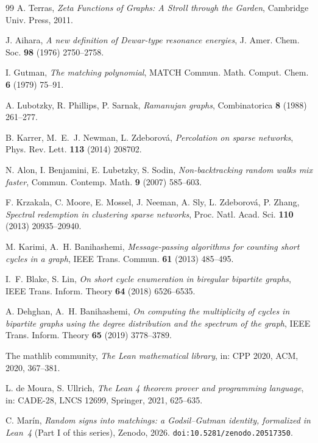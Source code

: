 \documentclass[11pt]{article}
\begin{document}
\begin{thebibliography}{99}
 A. Terras,
\emph{Zeta Functions of Graphs: A Stroll through the Garden}, Cambridge Univ. Press, 2011.

 J. Aihara,
\emph{A new definition of Dewar-type resonance energies},
J. Amer. Chem. Soc. \textbf{98} (1976) 2750--2758.

 I. Gutman,
\emph{The matching polynomial}, MATCH Commun. Math. Comput. Chem. \textbf{6} (1979)
75--91.

 A. Lubotzky, R. Phillips, P. Sarnak,
\emph{Ramanujan graphs}, Combinatorica \textbf{8} (1988) 261--277.

 B. Karrer, M.~E.~J. Newman, L. Zdeborov\'a,
\emph{Percolation on sparse networks}, Phys. Rev. Lett. \textbf{113} (2014) 208702.

 N. Alon, I. Benjamini, E. Lubetzky, S. Sodin,
\emph{Non-backtracking random walks mix faster}, Commun. Contemp. Math. \textbf{9} (2007)
585--603.

 F. Krzakala, C. Moore, E. Mossel, J. Neeman, A. Sly, L. Zdeborov\'a,
P. Zhang, \emph{Spectral redemption in clustering sparse networks},
Proc. Natl. Acad. Sci. \textbf{110} (2013) 20935--20940.

 M. Karimi, A.~H. Banihashemi,
\emph{Message-passing algorithms for counting short cycles in a graph},
IEEE Trans. Commun. \textbf{61} (2013) 485--495.

 I.~F. Blake, S. Lin,
\emph{On short cycle enumeration in biregular bipartite graphs},
IEEE Trans. Inform. Theory \textbf{64} (2018) 6526--6535.

 A. Dehghan, A.~H. Banihashemi,
\emph{On computing the multiplicity of cycles in bipartite graphs using the degree
distribution and the spectrum of the graph}, IEEE Trans. Inform. Theory \textbf{65} (2019)
3778--3789.

 The mathlib community,
\emph{The Lean mathematical library}, in: CPP 2020, ACM, 2020, 367--381.

 L. de Moura, S. Ullrich,
\emph{The Lean 4 theorem prover and programming language}, in: CADE-28, LNCS 12699,
Springer, 2021, 625--635.

 C. Mar\'in,
\emph{Random signs into matchings: a Godsil--Gutman identity, formalized in Lean~4}
(Part I of this series), Zenodo, 2026. \texttt{doi:10.5281/zenodo.20517350}.


\end{thebibliography}
\end{document}
